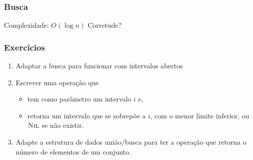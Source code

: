 \documentclass{beamer}
\begin{document}
\begin{frame}
\frametitle{Busca}



\alert{Complexidade}: $O(\log n)$
\pause
\alert{Corretude?}
\end{frame}

\begin{frame}
\frametitle{Exercícios}

\begin{enumerate}
\item Adaptar a busca para funcionar com intervalos abertos
\item Escrever uma operação que
\begin{itemize}
\item tem como parâmetro um intervalo $i$ e,
\item retorna um intervalo que se sobrepõe a $i$, com o menor limite
  inferior, ou $\textnormal{\scshape Nil}$ se não existir.
\end{itemize}
\item Adapte a estrutura de dados união/busca para ter a operação que
  retorna o número de elementos de um conjunto.
\end{enumerate}
\end{frame}
\end{document}
